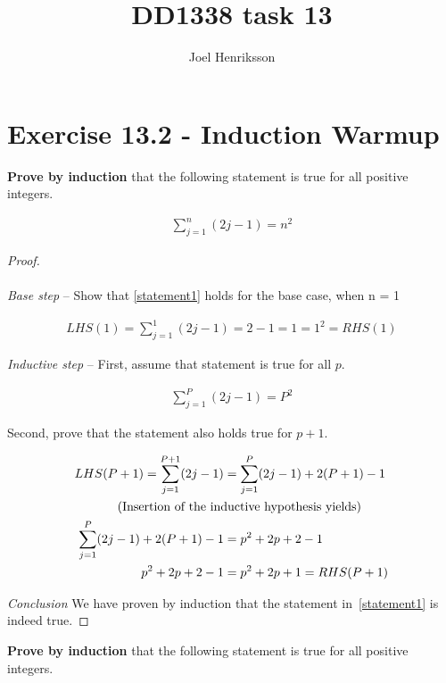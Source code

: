 \documentclass{article}
\title{DD1338 task 13}
\author{Joel Henriksson}
\date{}
\begin{document}
\maketitle
\section{Exercise 13.2 - Induction Warmup}
\textbf{Prove by induction} that the following statement is true for all positive integers.

\begin{align}
    \label{statement1}
    \sum_{j=1}^{n}(2j-1) = n^2
\end{align}

\begin{proof}

\textit{\\\\Base step} -- Show that \cref{statement1} holds for the base case, when n = 1

\begin{align}
    \label{basestep}
    LHS(1) = \sum_{j=1}^{1}(2j-1) = 2-1 = 1 = 1^2 = RHS(1)
\end{align}

\textit{Inductive step} -- First, assume that statement is true for all $p$.

\begin{align}
    \label{assumption}
    \sum_{j=1}^{P}(2j-1) = P^2
\end{align}

Second, prove that the statement also holds true for $p+1$.

\begin{align}
    \label{proof}
    LHS(P+1) = \sum_{j=1}^{P+1}(2j-1) &= \sum_{j=1}^{P}(2j-1) + 2(P+1)-1\notag\\
    &\hspace{-3cm} \text{(Insertion of the inductive hypothesis yields)}\notag\\
    \sum_{j=1}^{P}(2j-1) + 2(P+1)-1 &= p^2 + 2p + 2 -1\notag\\
    p^2 + 2p + 2 -1 &= p^2 + 2p + 1 = RHS(P+1)
\end{align}

\textit{Conclusion} We have proven by induction that the statement in~\cref{statement1} is indeed true.

\end{proof}

\textbf{Prove by induction} that the following statement is true for all positive integers.
\end{document}
